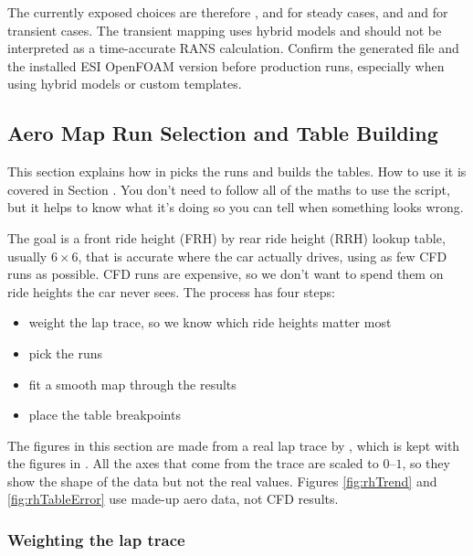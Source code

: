 The currently exposed choices are therefore ,  and  for steady cases, and  and  for transient cases. The transient mapping uses hybrid models and should not be interpreted as a time-accurate RANS calculation. Confirm the generated  file and the installed ESI OpenFOAM version before production runs, especially when using hybrid models or custom templates.

\subsection{Aero Map Run Selection and Table Building}
\label{sec:rhTheory}

This section explains how  in  picks the runs and builds the tables. How to use it is covered in Section . You don't need to follow all of the maths to use the script, but it helps to know what it's doing so you can tell when something looks wrong.

The goal is a front ride height (FRH) by rear ride height (RRH) lookup table, usually $6\times6$, that is accurate where the car actually drives, using as few CFD runs as possible. CFD runs are expensive, so we don't want to spend them on ride heights the car never sees. The process has four steps:
\begin{itemize}
    \item weight the lap trace, so we know which ride heights matter most
    \item pick the runs
    \item fit a smooth map through the results
    \item place the table breakpoints
\end{itemize}

The figures in this section are made from a real lap trace by , which is kept with the figures in . All the axes that come from the trace are scaled to $0$--$1$, so they show the shape of the data but not the real values. Figures \ref{fig:rhTrend} and \ref{fig:rhTableError} use made-up aero data, not CFD results.

\subsubsection{Weighting the lap trace}

